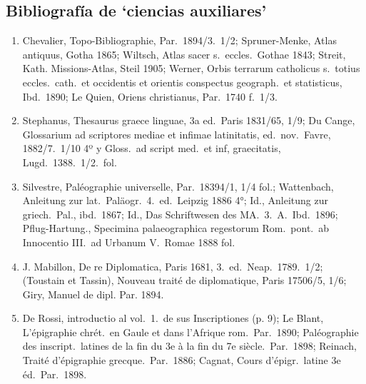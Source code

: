 \raggedbottom{} \documentclass[12pt, a4paper]{book}
\begin{document}
\subsection{Bibliografía de `ciencias auxiliares'}
\begin{enumerate}
  \item Chevalier, Topo-Bibliographie, Par.\ 1894/3.\ 1/2; Spruner-Menke, Atlas antiquus, Gotha 1865; Wiltsch, Atlas sacer s.\ eccles.\ Gothae 1843; Streit, Kath. Missions-Atlas, Steil 1905; Werner, Orbis terrarum catholicus s.\ totius eccles.\ cath.\ et occidentis et orientis conspectus geograph.\ et statisticus, Ibd.\ 1890; Le Quien, Oriens christianus, Par.\ 1740 f.\ 1/3.
  \item Stephanus, Thesaurus graece linguae, 3a ed.\ Paris 1831/65, 1/9; Du Cange, Glossarium ad scriptores mediae et infimae latinitatis, ed.\ nov.\ Favre, 1882/7.\ 1/10 4º y Gloss.\ ad script med.\ et inf, graecitatis, Lugd.\ 1388.\ 1/2.\ fol.\
  \item Silvestre, Paléographie universelle, Par.\ 18394/1, 1/4 fol.; Wattenbach, Anleitung zur lat.\ Paläogr.\ 4.\ ed.\ Leipzig 1886 4°; Id., Anleitung zur griech.\ Pal., ibd.\ 1867; Id., Das Schriftwesen des MA.\ 3.\ A.\ Ibd.\ 1896; Pflug-Hartung., Specimina palaeographica regestorum Rom.\ pont.\ ab Innocentio III.\ ad Urbanum V.\ Romae 1888 fol.
  \item J. Mabillon, De re Diplomatica, Paris 1681, 3.\ ed.\ Neap.\ 1789.\ 1/2; (Toustain et Tassin), Nouveau traité de diplomatique, Paris 17506/5, 1/6; Giry, Manuel de dipl. Par. 1894.
  \item De Rossi, introductio al vol.\ 1.\ de sus Inscriptiones (p. 9); Le Blant, L'épigraphie chrét.\ en Gaule et dans l'Afrique rom.\ Par.\ 1890; Paléographie des inscript.\ latines de la fin du 3e à la fin du 7e siècle.\ Par.\ 1898; Reinach, Traité d'épigraphie grecque.\ Par.\ 1886; Cagnat, Cours d'épigr.\ latine 3e éd.\ Par.\ 1898.
\end{enumerate}
\end{document}

